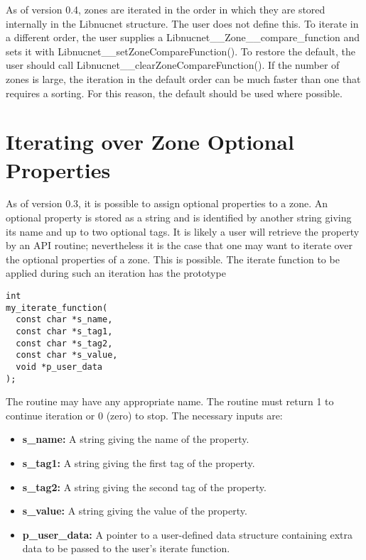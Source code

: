\documentclass{article}    %
\begin{document}
As of version 0.4, zones are iterated
in the order in which they are stored internally in the Libnucnet
structure.  The user does not define this.  To iterate in a different order,
the user supplies a Libnucnet\_\_Zone\_\_compare\_function and sets it
with Libnucnet\_\_setZoneCompareFunction().  To restore the
default, the user should call
Libnucnet\_\_clearZoneCompareFunction().
If the number of zones is large, the iteration in the default order can be
much faster than one that requires a sorting.  For this reason, the default
should be used where possible.

\section{Iterating over Zone Optional Properties} 

As of version 0.3, it is possible to assign optional properties to a zone.
An optional property is stored as a string and is identified by another
string giving its name and up to two optional tags.  It is likely a user
will retrieve the property by an API routine; nevertheless
it is the case that one may
want to iterate over the optional properties of a zone.  This is possible.
The iterate function to be applied during such an iteration has the prototype

\begin{verbatim}
int
my_iterate_function(
  const char *s_name,
  const char *s_tag1,
  const char *s_tag2,
  const char *s_value,
  void *p_user_data
);
\end{verbatim}

\noindent
The routine may have any appropriate name.
The routine must return 1 to continue iteration or 0 (zero) to stop.
The necessary inputs are:

\begin{itemize}

\item {\bf s\_name:}  A string giving the name of the property.

\item {\bf s\_tag1:}  A string giving the first tag of the property.

\item {\bf s\_tag2:}  A string giving the second tag of the property.

\item {\bf s\_value:}  A string giving the value of the property.

\item {\bf p\_user\_data:}  A pointer to a user-defined data structure
containing extra data to be passed to the user's iterate function.

\end{itemize}
\end{document}
